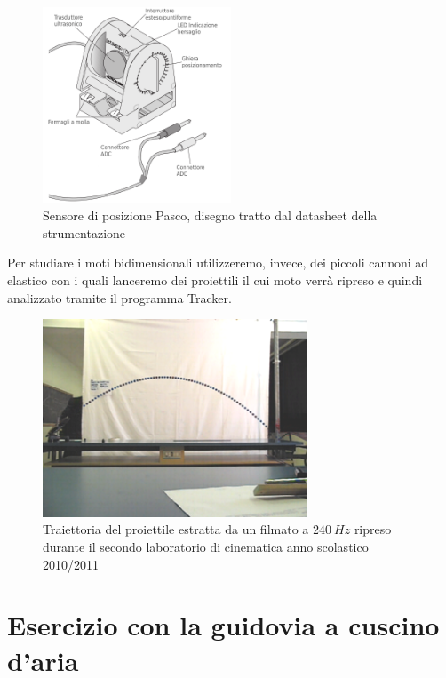 \documentclass[a4paper,10pt,oneside]{article}
\begin{document}
\begin{figure}[H]
 \centering
 \includegraphics[width=0.5\textwidth]{./Immagini/sensore_moto_pasco.png}
 \caption{Sensore di posizione Pasco, disegno tratto dal datasheet della strumentazione}
 \label{fig:Pasco_sensore1}
\end{figure}
Per studiare  i moti bidimensionali utilizzeremo, invece, dei piccoli cannoni ad elastico con i quali lanceremo dei proiettili il cui moto verrà ripreso e quindi analizzato tramite il programma Tracker.
\begin{figure}[H]
 \centering
 \includegraphics[width=0.7\textwidth]{./Immagini/traiettoria.png}
 \caption{Traiettoria del proiettile estratta da un filmato a $240\ Hz$ ripreso durante il secondo laboratorio di cinematica anno scolastico 2010/2011}
 \label{fig:traiettoria_1}
\end{figure}


\section*{Esercizio con la guidovia a cuscino d'aria}
\end{document}
